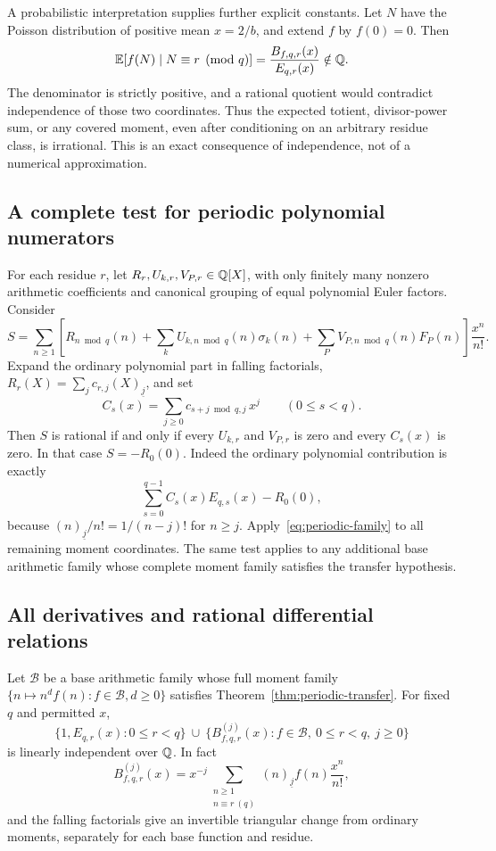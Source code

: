 A probabilistic interpretation supplies further explicit constants.
Let $N$ have the Poisson distribution of positive mean $x=2/b$, and
extend $f$ by $f(0)=0$. Then
\begin{equation}\label{eq:conditional-poisson}
 \mathbb E\!\left[f(N)\mid N\equiv r\pmod q\right]
       =\frac{B_{f,q,r}(x)}{E_{q,r}(x)}\notin\mathbb Q.
\end{equation}
The denominator is strictly positive, and a rational quotient would
contradict independence of those two coordinates. Thus the expected
totient, divisor-power sum, or any covered moment, even after
conditioning on an arbitrary residue class, is irrational. This is an
exact consequence of independence, not of a numerical approximation.

\subsection{A complete test for periodic polynomial numerators}
For each residue $r$, let $R_r,U_{k,r},V_{P,r}\in\mathbb Q[X]$, with only
finitely many nonzero arithmetic coefficients and canonical grouping
of equal polynomial Euler factors. Consider
\[
 S=\sum_{n\geq1}\left[R_{n\bmod q}(n)
       +\sum_kU_{k,n\bmod q}(n)\sigma_k(n)
       +\sum_PV_{P,n\bmod q}(n)F_P(n)\right]\frac{x^n}{n!}.
\]
Expand the ordinary polynomial part in falling factorials,
$R_r(X)=\sum_j c_{r,j}(X)_{\underline j}$, and set
\[
 C_s(x)=\sum_{j\geq0}c_{s+j\bmod q,j}\,x^j
       \qquad(0\leq s<q).
\]
Then $S$ is rational if and only if every $U_{k,r}$ and $V_{P,r}$
is zero and every $C_s(x)$ is zero. In that case $S=-R_0(0)$.
Indeed the ordinary polynomial contribution is exactly
\[
 \sum_{s=0}^{q-1}C_s(x)E_{q,s}(x)-R_0(0),
\]
because $(n)_{\underline j}/n!=1/(n-j)!$ for $n\geq j$.
Apply~\eqref{eq:periodic-family} to all remaining moment coordinates.
The same test applies to any additional base arithmetic family whose
complete moment family satisfies the transfer hypothesis.

\subsection{All derivatives and rational differential relations}
Let $\mathcal B$ be a base arithmetic family whose full moment family
$\{n\mapsto n^df(n):f\in\mathcal B,d\geq0\}$ satisfies
Theorem~\ref{thm:periodic-transfer}. For fixed $q$ and permitted $x$,
\[
 \{1,E_{q,r}(x):0\leq r<q\}\ \cup\
 \{B_{f,q,r}^{(j)}(x):f\in\mathcal B,\ 0\leq r<q,\ j\geq0\}
\]
is linearly independent over $\mathbb Q$. In fact
\[
 B_{f,q,r}^{(j)}(x)
  =x^{-j}\sum_{\substack{n\geq1\\n\equiv r\ (q)}}
                  (n)_{\underline j}f(n)\frac{x^n}{n!},
\]
and the falling factorials give an invertible triangular change from
ordinary moments, separately for each base function and residue.

